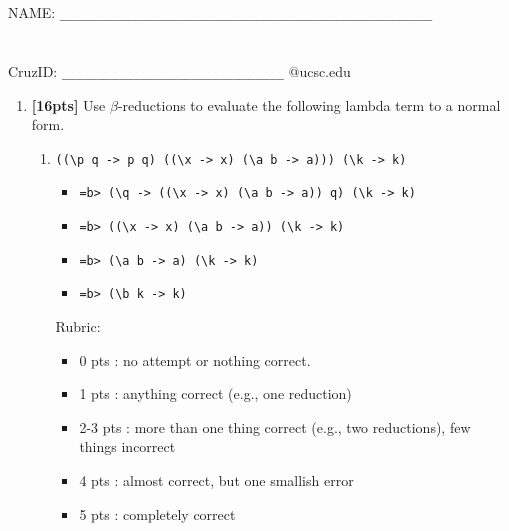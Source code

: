 \documentclass[paper=letter, fontsize=13pt]{article} %
\numberwithin{equation}{section} %
\newif\ifshowanswers\showanswerstrue
\begin{document}
\bigskip
\bigskip
\bigskip
\bigskip
\bigskip
\bigskip
\bigskip
\bigskip
\bigskip
\bigskip
\bigskip
\bigskip
\bigskip
\bigskip
\bigskip
\bigskip
\noindent NAME: \verb|____________________________________________________| \\
\bigskip\\ 
\bigskip\\
CruzID: \verb|_______________________________| @ucsc.edu

\newpage
{}

\bigskip

\begin{enumerate} 
\item \textbf{[16pts]} Use $\beta$-reductions to evaluate the following lambda term to a normal form. \\
\bigskip
\bigskip
\begin{enumerate}[label=(\Alph*)]
\item {\Large
\verb|((\p q -> p q) ((\x -> x) (\a b -> a))) (\k -> k)|
}
\ifshowanswers
\begin{itemize}
\item \verb|=b> (\q -> ((\x -> x) (\a b -> a)) q) (\k -> k)|
\item \verb|=b> ((\x -> x) (\a b -> a)) (\k -> k)|
\item \verb|=b> (\a b -> a) (\k -> k)|
\item \verb|=b> (\b k -> k)|
\end{itemize}
Rubric:
\begin{itemize}
\item 0 pts : no attempt or nothing correct.
\item 1 pts : anything correct (e.g., one reduction)
\item 2-3 pts : more than one thing correct (e.g., two reductions), few things incorrect
\item 4 pts : almost correct, but one smallish error
\item 5 pts : completely correct
\end{itemize}
\else
\bigskip
\bigskip
\bigskip
\bigskip
\bigskip
\bigskip
\bigskip
\bigskip
\bigskip
\bigskip
\bigskip
\bigskip
\bigskip
\bigskip
\bigskip
\bigskip
\bigskip
\bigskip
\bigskip
\bigskip
\bigskip
\bigskip
\fi


\end{enumerate}
\end{enumerate}
\end{document}
